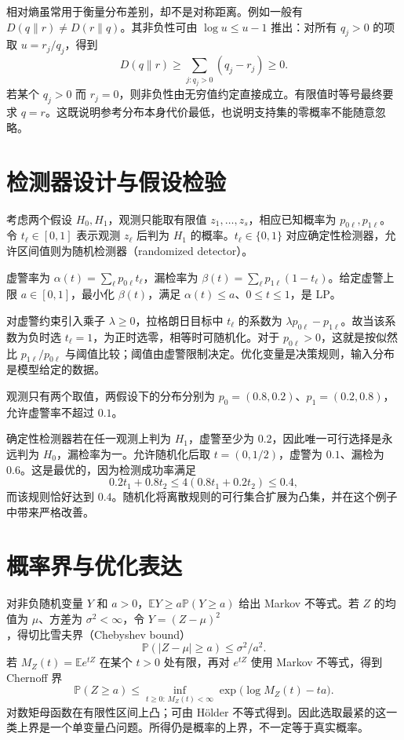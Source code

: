 \documentclass[UTF8,12pt,a4paper,fontset=fandol]{ctexbook}
\begin{document}
相对熵虽常用于衡量分布差别，却不是对称距离。例如一般有 $D(q\|r)\ne D(r\|q)$。其非负性可由 $\log u\leq u-1$ 推出：对所有 $q_j>0$ 的项取 $u=r_j/q_j$，得到
\[
 D(q\|r)\geq\sum_{j:q_j>0}(q_j-r_j)\geq0.
\]
若某个 $q_j>0$ 而 $r_j=0$，则非负性由无穷值约定直接成立。有限值时等号最终要求 $q=r$。这既说明参考分布本身代价最低，也说明支持集的零概率不能随意忽略。

\section{检测器设计与假设检验}

考虑两个假设 $H_0,H_1$，观测只能取有限值 $z_1,\ldots,z_s$，相应已知概率为 $p_{0\ell},p_{1\ell}$。令 $t_\ell\in[0,1]$ 表示观测 $z_\ell$ 后判为 $H_1$ 的概率。$t_\ell\in\{0,1\}$ 对应确定性检测器，允许区间值则为随机检测器（randomized detector）。

虚警率为 $\alpha(t)=\sum_\ell p_{0\ell}t_\ell$，漏检率为 $\beta(t)=\sum_\ell p_{1\ell}(1-t_\ell)$。给定虚警上限 $a\in[0,1]$，最小化 $\beta(t)$，满足 $\alpha(t)\leq a$、$0\leq t\leq1$，是 LP。

对虚警约束引入乘子 $\lambda\geq0$，拉格朗日目标中 $t_\ell$ 的系数为 $\lambda p_{0\ell}-p_{1\ell}$。故当该系数为负时选 $t_\ell=1$，为正时选零，相等时可随机化。对于 $p_{0\ell}>0$，这就是按似然比 $p_{1\ell}/p_{0\ell}$ 与阈值比较；阈值由虚警限制决定。优化变量是决策规则，输入分布是模型给定的数据。

\begin{example}[随机化为什么会改善检测器]
观测只有两个取值，两假设下的分布分别为 $p_0=(0.8,0.2)$、$p_1=(0.2,0.8)$，允许虚警率不超过 $0.1$。
\end{example}
\begin{solve}
确定性检测器若在任一观测上判为 $H_1$，虚警至少为 $0.2$，因此唯一可行选择是永远判为 $H_0$，漏检率为一。允许随机化后取 $t=(0,1/2)$，虚警为 $0.1$、漏检为 $0.6$。这是最优的，因为检测成功率满足
\[
 0.2t_1+0.8t_2\leq4(0.8t_1+0.2t_2)\leq0.4,
\]
而该规则恰好达到 $0.4$。随机化将离散规则的可行集合扩展为凸集，并在这个例子中带来严格改善。
\end{solve}

\section{概率界与优化表达}

对非负随机变量 $Y$ 和 $a>0$，$\mathbb EY\geq a\mathbb P(Y\geq a)$ 给出 Markov 不等式。若 $Z$ 的均值为 $\mu$、方差为 $\sigma^2<\infty$，令 $Y=(Z-\mu)^2$，得切比雪夫界（Chebyshev bound）
\[
 \mathbb P(|Z-\mu|\geq a)\leq\sigma^2/a^2.
\]
若 $M_Z(t)=\mathbb E e^{tZ}$ 在某个 $t>0$ 处有限，再对 $e^{tZ}$ 使用 Markov 不等式，得到 Chernoff 界
\[
 \mathbb P(Z\geq a)\leq\inf_{t\geq0:\,M_Z(t)<\infty}
       \exp\bigl(\log M_Z(t)-ta\bigr).
\]
对数矩母函数在有限性区间上凸；可由 Hölder 不等式得到。因此选取最紧的这一类上界是一个单变量凸问题。所得仍是概率的上界，不一定等于真实概率。
\end{document}
